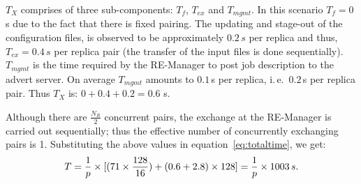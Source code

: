 \documentclass{rspublic}
\newcommand{\jhanote}[1]{ {\textcolor{red} { ***shantenu: #1 }}}
\newcommand{\alnote}[1]{ {\textcolor{blue} { ***andre: #1 }}}
\newcommand{\athotanote}[1]{ {\textcolor{green} { ***athota: #1 }}}
\newcommand{\alnote}[1]{}
\newcommand{\athotanote}[1]{}
\newcommand{\jhanote}[1]{}
\begin{document}



$T_{X}$ comprises of three sub-components: $T_f$, $T_{ex}$ and
$T_{mgmt}$. In this scenario $T_{f}=0$\,s due to the fact that there
is fixed pairing. The updating and stage-out of the configuration
files, is observed to be approximately $0.2\,s$ per replica and thus,
$T_{ex} = 0.4\,s$ per replica pair (the transfer of the input files is
done sequentially). 
$T_{mgmt}$ is the time required by the RE-Manager to post job
description to the advert server. On average $T_{mgmt}$ amounts to
$0.1$\,s per replica, i.\,e.\ $0.2$\,s per replica pair.
Thus $T_{X}$ is: $0+0.4+0.2=0.6$ s. 

Although there are $\frac{N_R}{2}$ concurrent pairs, the exchange 
at the RE-Manager is carried out sequentially; thus the effective 
number of concurrently exchanging pairs is 1. Substituting the above values in
equation~\ref{eq:totaltime}, we get:
\begin{eqnarray}
  T=  {1 \over p} \times {[ {(71\times {128\over 16}})+ (0.6 + 2.8)\times 128]} = {1 \over p} \times 1003\,s.
  \label{eq:sync}
\end{eqnarray}


\end{document}
